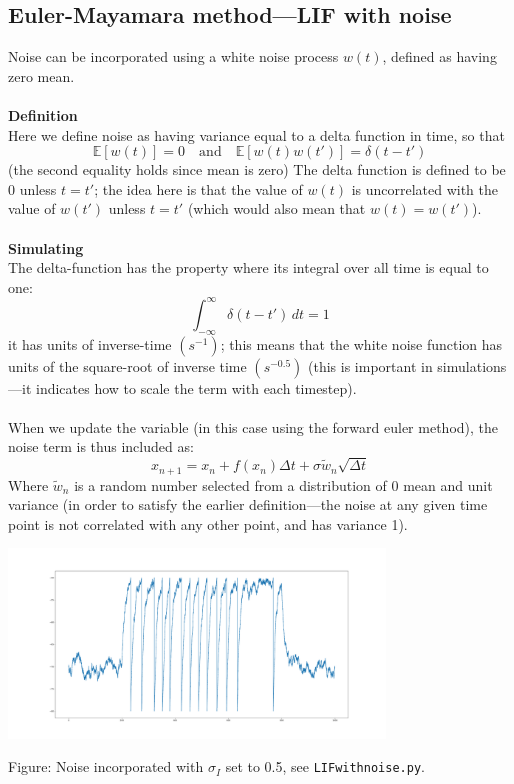 \documentclass{report}
\begin{document}
\subsection{Euler-Mayamara method---LIF with noise}
Noise can be incorporated using a white noise process $w(t)$, defined as having zero mean.\\ 
\vspace{1mm}\\
\textbf{Definition}\\
Here we define noise as having variance equal to a delta function in time, so that
\begin{equation*}
\mathbb{E}[w(t)]=0\quad\text{and}\quad\mathbb{E}[w(t)w(t')]=\delta(t-t')
\end{equation*}
(the second equality holds since mean is zero)
The delta function is defined to be 0 unless $t=t'$; the idea here is that the value of $w(t)$ is uncorrelated with the value of $w(t')$ unless $t=t'$ 
(which would also mean that $w(t)=w(t')$).\\
\vspace{1mm}\\
\textbf{Simulating}\\
The delta-function has the property where its integral over all time is equal to one:
\begin{equation*}
\int^\infty_{-\infty}\delta(t-t')\,dt=1
\end{equation*}
it has units of inverse-time $(s^{-1})$; this means that the white noise function has units of the square-root of inverse time $(s^{-0.5})$ (this is important in
simulations---it indicates how to scale the term with each timestep). \\
\vspace{1mm}\\
When we update the variable (in this case using the forward euler method), 
the noise term is thus included as:
\begin{equation*}
x_{n+1}=x_n+f(x_n)\Delta t+\sigma\tilde{w}_n\sqrt{\Delta t}
\end{equation*}
Where $\tilde{w}_n$ is a random number selected from a distribution of 0 mean and unit variance (in order to satisfy the earlier definition---the noise at any given time point 
is not correlated with any other point, and has variance 1).
\begin{center}
\includegraphics[width=10cm]{5}\\
\end{center}
Figure: Noise incorporated with $\sigma_I$ set to 0.5, see \texttt{LIFwithnoise.py}.
\newpage
\end{document}

